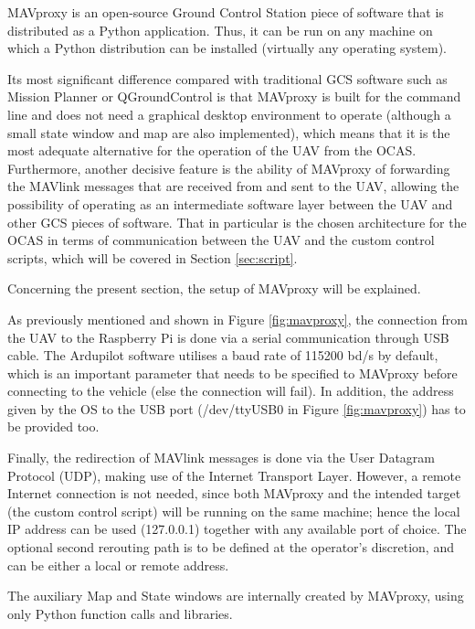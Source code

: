 MAVproxy is an open-source Ground Control Station piece of software that is distributed as a Python application.
Thus, it can be run on any machine on which a Python distribution can be installed (virtually any operating system).

Its most significant difference compared with traditional GCS software such as Mission Planner or QGroundControl is that MAVproxy is built for the command line and does not need a graphical desktop environment to operate (although a small state window and map are also implemented), which means that it is the most adequate alternative for the operation of the UAV from the OCAS.
Furthermore, another decisive feature is the ability of MAVproxy of forwarding the MAVlink messages that are received from and sent to the UAV, allowing the possibility of operating as an intermediate software layer between the UAV and other GCS pieces of software.
That in particular is the chosen architecture for the OCAS in terms of communication between the UAV and the custom control scripts, which will be covered in Section \ref{sec:script}.

Concerning the present section, the setup of MAVproxy will be explained.



As previously mentioned and shown in Figure \ref{fig:mavproxy}, the connection from the UAV to the Raspberry Pi is done via a serial communication through USB cable.
The Ardupilot software utilises a baud rate of 115200 bd/s by default, which is an important parameter that needs to be specified to MAVproxy before connecting to the vehicle (else the connection will fail).
In addition, the address given by the OS to the USB port (/dev/ttyUSB0 in Figure \ref{fig:mavproxy}) has to be provided too. 

Finally, the redirection of MAVlink messages is done via the User Datagram Protocol (UDP), making use of the Internet Transport Layer.
However, a remote Internet connection is not needed, since both MAVproxy and the intended target (the custom control script) will be running on the same machine; hence the local IP address can be used (127.0.0.1) together with any available port of choice.
The optional second rerouting path is to be defined at the operator's discretion, and can be either a local or remote address.

The auxiliary Map and State windows are internally created by MAVproxy, using only Python function calls and libraries.

